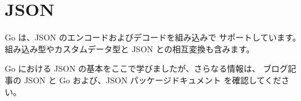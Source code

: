 \section{JSON}

Go は、JSON のエンコードおよびデコードを組み込みで サポートしています。組み込み型やカスタムデータ型と JSON との相互変換も含みます。




Go における JSON の基本をここで学びましたが、さらなる情報は、 ブログ記事の JSON と Go および、JSON パッケージドキュメント を確認してください。
